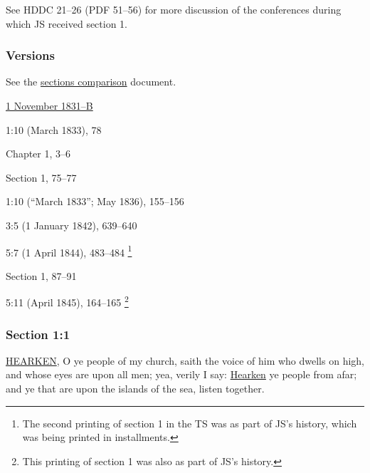 			See HDDC 21--26 (PDF 51--56) for more discussion of the conferences during which JS received section 1.
		
	\subsubsection{Versions}
		\label{DC1-V}
		
		See the \href{https://drive.google.com/file/d/1goAvNz8jS4R8slYfMG_db55Ty2z_vmgK/view?usp=sharing}{sections comparison} document.
	
		\begin{compactdesc}
			\item[JSP] \hyperref[EMS-1831-JS-1-NOV-1831-B]{1 November 1831--B}
			\item[EVMS] 1:10 (March 1833), 78
			\item[BC] Chapter 1, 3--6
			\item[DC 1835] Section 1, 75--77
			\item[EVMSR] 1:10 (``March 1833''; May 1836), 155--156
			\item[TS] 3:5 (1 January 1842), 639--640
			\item[TS] 5:7 (1 April 1844), 483--484%
				\footnote{%
					The second printing of section 1 in the TS was as part of JS's history, which was being printed in installments.
					}
			\item[DC 1844] Section 1, 87--91
			\item[MS] 5:11 (April 1845), 164--165%
				\footnote{%
					This printing of section 1 was also as part of JS's history.
					}
		\end{compactdesc}

	\subsubsection{Section 1:1} %
		\label{DC1-1}

		\hyperref[HEARKEN]{HEARKEN}, O ye people of my church, saith the voice of him who dwells on high, and whose eyes are upon all men; yea, verily I say: \hyperref[HEARKEN]{Hearken} ye people from afar; and ye that are upon the islands of the sea, listen together.


